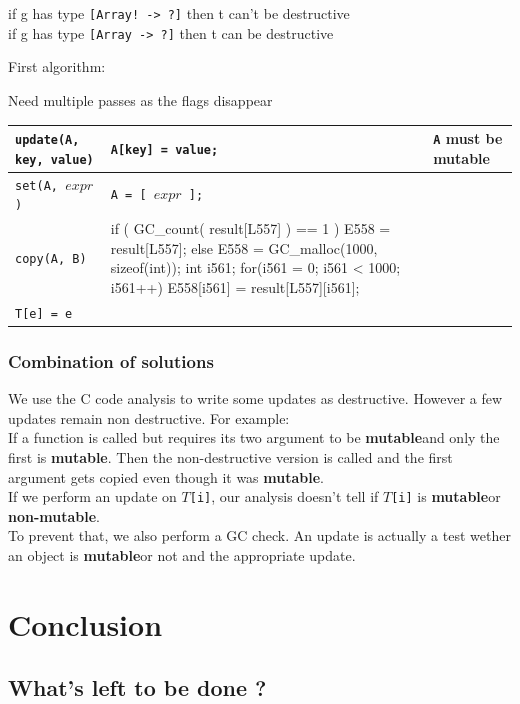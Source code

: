 \documentclass[12pt,a4paper,titlepage]{article}
\newcommand{\cl}[1]{\texttt{#1}}
\newcommand{\mut}{\textbf{mutable}}
\newcommand{\nmut}{\textbf{non-mutable}}
\begin{document}
if g has type \cl{[Array! -> ?]} then t can't be destructive\\

if g has type \cl{[Array -> ?]} then t can be destructive

First algorithm:


Need multiple passes as the flags disappear





\begin{tabular}{|p{50mm}|p{50mm}|p{50mm}|}
\hline
\cl{update(A, key, value)} & \cl{A[key] = value;} & \cl{A} must be \mut \\ \hline
\cl{set(A, $expr$)} & \cl{A = [ $expr$ ];} \\ \hline
\cl{copy(A, B)} & if ( GC_count( result[L557] ) == 1 )
    E558 = result[L557];
  else {
    E558 = GC_malloc(1000, sizeof(int));
    int i561;
    for(i561 = 0; i561 < 1000; i561++) {
      E558[i561] = result[L557][i561];
    }
  }
   & \\ \hline
\cl{T[e] = e} & & \\ \hline
\end{tabular}


\subsubsection{Combination of solutions}

We use the C code analysis to write some updates as destructive. However a few updates remain non destructive. For example:\\

If a function is called but requires its two argument to be \mut  and only the first is \mut. Then the non-destructive version is called and the first argument gets copied even though it was \mut.\\

If we perform an update on \cl{$T$[i]}, our analysis doesn't tell if \cl{$T$[i]} is \mut or \nmut.\\

To prevent that, we also perform a GC check. An update is actually a test wether an object is \mut or not and the appropriate update.




\section{Conclusion}

\subsection{What's left to be done ?}
\end{document}
